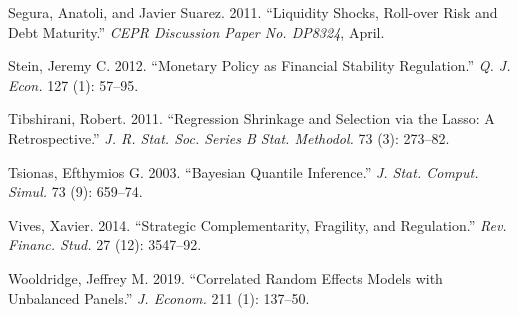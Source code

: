 \documentclass[
  10pt,
]{article}
\begin{document}
\leavevmode\hypertarget{ref-Segura2011}{}%
Segura, Anatoli, and Javier Suarez. 2011. ``Liquidity Shocks, Roll-over
Risk and Debt Maturity.'' \emph{CEPR Discussion Paper No. DP8324},
April.

\leavevmode\hypertarget{ref-Stein2012}{}%
Stein, Jeremy C. 2012. ``Monetary Policy as Financial Stability
Regulation.'' \emph{Q. J. Econ.} 127 (1): 57--95.

\leavevmode\hypertarget{ref-Tibshirani2011}{}%
Tibshirani, Robert. 2011. ``Regression Shrinkage and Selection via the
Lasso: A Retrospective.'' \emph{J. R. Stat. Soc. Series B Stat.
Methodol.} 73 (3): 273--82.

\leavevmode\hypertarget{ref-Tsionas2003}{}%
Tsionas, Efthymios G. 2003. ``Bayesian Quantile Inference.'' \emph{J.
Stat. Comput. Simul.} 73 (9): 659--74.

\leavevmode\hypertarget{ref-Vives2014}{}%
Vives, Xavier. 2014. ``Strategic Complementarity, Fragility, and
Regulation.'' \emph{Rev. Financ. Stud.} 27 (12): 3547--92.

\leavevmode\hypertarget{ref-Wooldridge2019}{}%
Wooldridge, Jeffrey M. 2019. ``Correlated Random Effects Models with
Unbalanced Panels.'' \emph{J. Econom.} 211 (1): 137--50.
\end{document}
